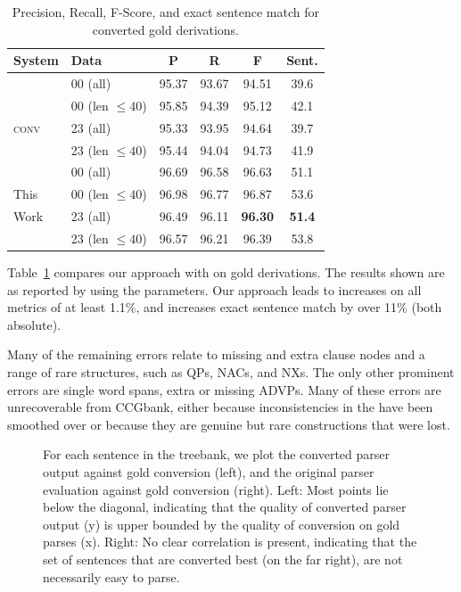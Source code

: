 \begin{table}
\centering
\begin{tabular}{llcccc}
	\hline
		System & Data & P & R & F & Sent. \\
	\hline
	\hline
		 & 00 (all) & 95.37 & 93.67 & 94.51 & 39.6 \\
		\candc & 00 (len $\le 40$) & 95.85 & 94.39 & 95.12 & 42.1 \\
		\textsc{conv} & 23 (all) & 95.33 & 93.95 & 94.64 & 39.7 \\
		 & 23 (len $\le 40$) & 95.44 & 94.04 & 94.73 & 41.9 \\
	\hline
		 & 00 (all) & 96.69 & 96.58 & 96.63 & 51.1 \\
		This & 00 (len $\le 40$) & 96.98 & 96.77 & 96.87 & 53.6 \\
		Work & 23 (all) & 96.49 & 96.11 & \textbf{96.30} & \textbf{51.4} \\
		 & 23 (len $\le 40$) & 96.57 & 96.21 & 96.39 & 53.8 \\
	\hline
\end{tabular}
\caption{\label{tab:conversion-comparison}
	\parseval Precision, Recall, F-Score, and exact sentence match for converted
	gold \ccg derivations.
}
\end{table}

Table~\ref{tab:conversion-comparison} compares our approach
with \old on gold \ccg derivations.  The results shown are 
as reported by \evalb
\parencite{Black-etal:1991} using the \textcite{Collins:1997} parameters.
Our approach leads to increases on all metrics of at least 1.1\%, and
increases exact sentence match by over 11\% (both absolute).

Many of the remaining errors relate to missing and extra clause nodes and a
range of rare structures, such as QPs, NACs, and NXs. The only other prominent
errors are single word spans, \myeg extra or missing ADVPs.  Many of these errors
are unrecoverable from CCGbank, either because inconsistencies in the \ptb have
been smoothed over or because they are genuine but rare constructions that
were lost.

\begin{figure}
	\hspace{-2.0cm}
	\scalebox{1.5}{
	
	\hspace{-2.0cm}
	
	}
	\caption{
		\label{fig:scatter_plots}
		For each sentence in the treebank, we plot the converted parser output
		against gold conversion (left), and the original parser evaluation against
		gold conversion (right).
		Left: Most points lie below the diagonal, indicating that the quality of
		converted parser output (y) is upper bounded by the quality of conversion on
		gold parses (x).
		Right: No clear correlation is present, indicating that the set of
		sentences that are converted best (on the far right), are not necessarily
		easy to parse.
	}
\end{figure}

